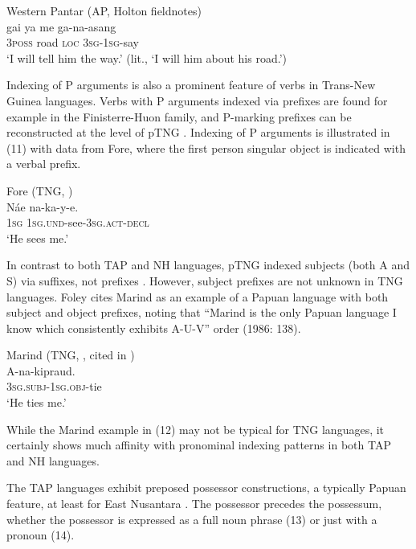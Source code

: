 \ea%
Western Pantar (AP, Holton fieldnotes) \\
\gll  gai ya me ga-na-asang \\
 \textsc{3poss} road \textsc{loc} \textsc{3sg-1sg}-say  \\
\glt `I will tell him the way.' (lit., `I will him about his road.')
\z





Indexing of P arguments is also a prominent feature of verbs in Trans-New Guinea languages. Verbs with P arguments indexed via prefixes are found for example in the Finisterre-Huon family, and P-marking prefixes can be reconstructed at the level of pTNG \citep{Suter2012}. Indexing of P arguments is illustrated in (11) with data from Fore, where the first person singular object is indicated with a verbal prefix.

\ea%
Fore (TNG, \citet[107]{Scott1978}) \\
\gll  N\'ae na-ka-y-e. \\
  1\textsc{sg} \textsc{1sg.und}-see-\textsc{3sg.act-decl}  \\
\glt `He sees me.'
\z





In contrast to both TAP and NH languages, pTNG indexed subjects (both A and S) via suffixes, not prefixes \citep{Foley2000}. However, subject prefixes are not unknown in TNG languages. Foley cites Marind as an example of a Papuan language with both subject and object prefixes, noting that ``Marind is the only Papuan language I know which consistently exhibits A-U-V'' order (1986: 138).\nocite{Marind1986}

\ea%
Marind (TNG, \citet{Drabbe1955}, cited in \citet[138]{Foley1986}) \\
\gll  A-na-kipraud. \\
   3\textsc{sg.subj-1sg.obj-}tie \\
\glt `He ties me.'
\z





While the Marind example in (12) may not be typical for TNG languages, it certainly shows much affinity with pronominal indexing patterns in both TAP and NH languages.

The TAP languages exhibit preposed possessor constructions, a typically Papuan feature, at least for East Nusantara \citep{KlamerEtAl2008}. The possessor precedes the possessum, whether the possessor is expressed as a full noun phrase (13) or just with a pronoun (14).


